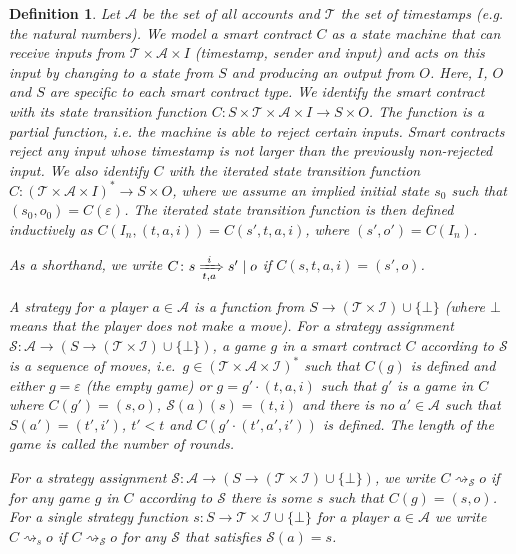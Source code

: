 \documentclass[11pt,letterpaper]{article}
\newtheorem{definition}[dummytheorem]{Definition}
\begin{document}
\begin{definition}
Let $\mathcal{A}$ be the set of all accounts and $\mathcal{T}$ the set of timestamps (e.g. the natural numbers).
We model a smart contract $C$ as a state machine that can receive inputs from $\mathcal{T} \times \mathcal{A} \times I$
(timestamp, sender and input)
and acts on this input by changing to a state from $S$ and producing an output from $O$. Here, $I$, $O$ and $S$
are specific to each smart contract type. We identify the smart contract with its state transition function
$C \colon S \times \mathcal{T} \times \mathcal{A} \times I \to S \times O$. The function is a partial function, i.e.
the machine is able to reject certain inputs. Smart contracts reject any input whose timestamp is
not larger than the previously non-rejected input. We also identify $C$ with the
iterated state transition function $C \colon (\mathcal{T} \times \mathcal{A} \times I)^* \to S \times O$,
where we assume an implied initial state $s_0$ such that $(s_0, o_0) = C(\varepsilon)$. The iterated state
transition function is then defined inductively as
$C(I_n, (t, a, i)) = C(s', t, a, i)$, where $(s', o') = C(I_n)$.

As a shorthand, we write $C\colon s \xRightarrow[t, a]{i} s' \mid o$ if $C(s, t, a, i) = (s', o)$.

A \emph{strategy} for a player $a \in \mathcal{A}$ is a function
from $S \to (\mathcal{T} \times \mathcal{I}) \cup \{ \bot \}$ (where $\bot$ means that the player
does not make a move).
For a strategy assignment $\mathcal{S} \colon \mathcal{A} \to (S \to (\mathcal{T} \times \mathcal{I}) \cup \{ \bot \})$,
a \emph{game} $g$ in a smart contract $C$ according to $\mathcal{S}$ is a sequence of moves, i.e.\ $g \in (\mathcal{T} \times \mathcal{A} \times \mathcal{I})^*$ such that
$C(g)$ is defined and either $g = \varepsilon$ (the empty game) or $g = g' \cdot (t, a, i)$ such that
$g'$ is a game in $C$ where $C(g') = (s, o)$, $\mathcal{S}(a)(s) = (t, i)$ and there is no $a' \in \mathcal{A}$ such that
$S(a') = (t',i')$, $t' < t$ and $C(g' \cdot (t', a', i'))$ is defined. The length of the game is called
the number of \emph{rounds}.

For a strategy assignment $\mathcal{S} \colon \mathcal{A} \to (S \to (\mathcal{T} \times \mathcal{I}) \cup \{ \bot \})$, we write
$C \rightsquigarrow_{\mathcal{S}} o$ if for any game $g$ in $C$ according to $\mathcal{S}$ there is
some $s$ such that $C(g) = (s,o)$. For a single strategy function
$s \colon S \to \mathcal{T} \times \mathcal{I} \cup \{ \bot \}$ for a player $a \in \mathcal{A}$
we write $C \rightsquigarrow_s o$
if $C \rightsquigarrow_{\mathcal{S}} o$ for any $\mathcal{S}$ that satisfies $\mathcal{S}(a) = s$.
\end{definition}
\end{document}
